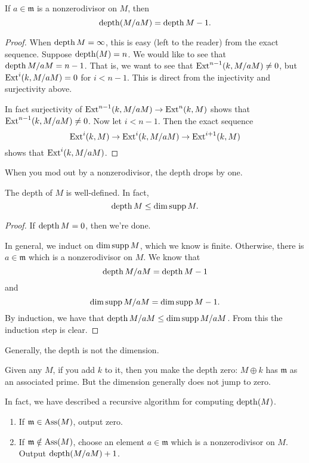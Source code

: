 \begin{corollary}
If $a \in \mathfrak{m}$ is a nonzerodivisor on $M$, then
\[ \operatorname{depth}(M/aM) = \operatorname{depth} M -1.  \]
\end{corollary}
\begin{proof}
When $\operatorname{depth} M = \infty$, this is easy (left to the reader) from
the exact
sequence. Suppose $\operatorname{depth}(M) = n$. We would like to see that
$\operatorname{depth} M/aM =
n-1$. That is, we want to see that $\operatorname{Ext}^{n-1}(k,M/aM) \neq 0$,
but
$\operatorname{Ext}^i(k,M/aM) =
0$ for $i < n-1$. This is direct from the injectivity and
surjectivity above.

In fact surjectivity of $\operatorname{Ext}^{n-1}(k,M/aM) \to \operatorname{Ext}^n(k,M)$
shows that
$\operatorname{Ext}^{n-1}(k,M/aM) \neq 0$. Now let $i < n-1$. Then the exact
sequence
\[ \operatorname{Ext}^i(k,M) \to \operatorname{Ext}^i(k,M/aM) \to \operatorname{Ext}^{i+1}(k,M)  \]
shows that $\operatorname{Ext}^i(k, M/aM)$.
\end{proof}

When you mod out by a nonzerodivisor, the depth drops by one.

\begin{corollary}
The depth of $M$ is well-defined. In fact,
\[ \operatorname{depth} M \leq \dim \operatorname{supp} M.  \]
\end{corollary}
\begin{proof}
If $\operatorname{depth} M = 0$, then we're done.

In general, we induct on $\dim \operatorname{supp} M$, which we know is
finite. Otherwise,
there is $ a \in \mathfrak{m}$ which is a nonzerodivisor on $M$.
We know that
\[ \operatorname{depth} M/aM = \operatorname{depth} M -1  \]
and
\[ \dim \operatorname{supp} M/aM = \dim \operatorname{supp} M -1.  \]
By induction, we have that $\operatorname{depth} M/aM \leq \dim \operatorname{supp} M/aM$.
From this the
induction step is clear.
\end{proof}

Generally, the depth is not the dimension.
\begin{example}
Given any $M$, if you add $k$ to it, then you make the depth
zero: $M \oplus k$
has $\mathfrak{m}$ as an associated prime. But the dimension
generally does not
jump to zero.
\end{example}

In fact, we have described a recursive algorithm for computing
$\operatorname{depth}(M)$.
\begin{enumerate}
\item If $\mathfrak{m}  \in \operatorname{Ass}(M)$, output zero.
\item If $\mathfrak{m} \notin \operatorname{Ass}(M)$, choose an element $a
\in\mathfrak{m}$
which is a nonzerodivisor on $M$. Output $\operatorname{depth}(M/aM) +1$.
\end{enumerate}


